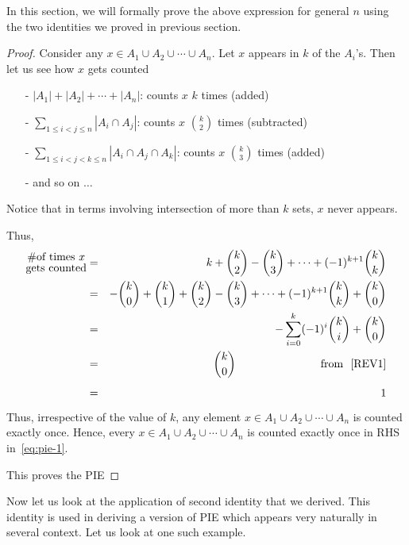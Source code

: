 In this section, we will formally prove the above expression for general $n$ using the two identities we proved in previous section.
\begin{proof}
Consider any $x\in A_1\cup A_2\cup\cdots\cup A_n$. Let $x$ appears in $k$ of the $A_i$'s. Then let us see how $x$ gets counted
\begin{itemize}
    \item[-] $|A_1|+|A_2|+\cdots +|A_n|$: counts $x$ $k$ times (added)
    \item[-] $\sum_{1\le i<j\le n}|A_i\cap A_j|$: counts $x$ ${k\choose 2}$ times (subtracted)
    \item[-] $\sum_{1\le i<j<k\le n}|A_i\cap A_j\cap A_k|$: counts $x$ ${k\choose 3}$ times (added) 
    \item[-] and so on $\ldots$
\end{itemize}
Notice that in terms involving intersection of more than $k$ sets, $x$ never appears.

Thus, 
\begin{eqnarray*} 
{\Large\substack{\# \text{of times $x$}\\ \text{gets counted}}} &=& k+{k\choose 2}-{k\choose 3}+\cdots +(-1)^{k+1}{k\choose k}\\
&=&-{k\choose 0}+{k\choose 1}+{k\choose 2}-{k\choose 3}+\cdots +(-1)^{k+1}{k\choose k}+{k\choose 0}\\
&=&-\sum_{i=0}^k(-1)^{i}{k\choose i}+{k\choose 0}\\
&=&{k\choose 0} ~~~~~~~~~~~~~~~~~~~~~~~\text{from ~\eqref{REV1}}\\
&=& 1
\end{eqnarray*}
Thus, irrespective of the value of $k$, any element $x\in A_1\cup A_2\cup\cdots\cup A_n$ is counted exactly once. Hence, every $x\in A_1\cup A_2\cup\cdots\cup A_n$ is counted exactly once in RHS in~\eqref{eq:pie-1}.

This proves the PIE
\end{proof}
Now let us look at the application of second identity that we derived. This identity is used in deriving a version of PIE which appears very naturally in several context. Let us look at one such example.

